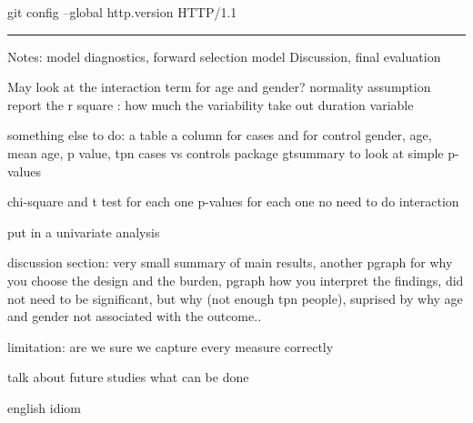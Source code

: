 \documentclass[
]{article}
\begin{document}
git config --global http.version HTTP/1.1

\begin{center}\rule{0.5\linewidth}{0.5pt}\end{center}

Notes: model diagnostics, forward selection model Discussion, final
evaluation

May look at the interaction term for age and gender? normality
assumption report the r square : how much the variability take out
duration variable

something else to do: a table a column for cases and for control gender,
age, mean age, p value, tpn cases vs controls package gtsummary to look
at simple p-values

chi-square and t test for each one p-values for each one no need to do
interaction

put in a univariate analysis

discussion section: very small summary of main results, another pgraph
for why you choose the design and the burden, pgraph how you interpret
the findings, did not need to be significant, but why (not enough tpn
people), suprised by why age and gender not associated with the
outcome..

limitation: are we sure we capture every measure correctly

talk about future studies what can be done

english idiom
\end{document}
